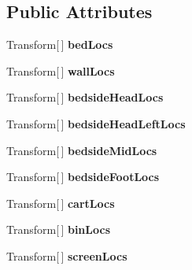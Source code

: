 \subsection*{Public Attributes}
\begin{DoxyCompactItemize}
\item 
Transform\mbox{[}$\,$\mbox{]} {\bfseries bed\+Locs}\hypertarget{class_room_script_a4e662f56439b7223b58794de1e0204a3}{}\label{class_room_script_a4e662f56439b7223b58794de1e0204a3}

\item 
Transform\mbox{[}$\,$\mbox{]} {\bfseries wall\+Locs}\hypertarget{class_room_script_a5fa75182517049f1d154ad7654a7d823}{}\label{class_room_script_a5fa75182517049f1d154ad7654a7d823}

\item 
Transform\mbox{[}$\,$\mbox{]} {\bfseries bedside\+Head\+Locs}\hypertarget{class_room_script_a4895a26a7d5bc3dcb280ca9d95f21643}{}\label{class_room_script_a4895a26a7d5bc3dcb280ca9d95f21643}

\item 
Transform\mbox{[}$\,$\mbox{]} {\bfseries bedside\+Head\+Left\+Locs}\hypertarget{class_room_script_ad00174270e0849852fb0f06169529bf5}{}\label{class_room_script_ad00174270e0849852fb0f06169529bf5}

\item 
Transform\mbox{[}$\,$\mbox{]} {\bfseries bedside\+Mid\+Locs}\hypertarget{class_room_script_a2383b4c41dfa2fc1a944c8a7396ea662}{}\label{class_room_script_a2383b4c41dfa2fc1a944c8a7396ea662}

\item 
Transform\mbox{[}$\,$\mbox{]} {\bfseries bedside\+Foot\+Locs}\hypertarget{class_room_script_a3942803d35d0c71a675cc1a7292ee75a}{}\label{class_room_script_a3942803d35d0c71a675cc1a7292ee75a}

\item 
Transform\mbox{[}$\,$\mbox{]} {\bfseries cart\+Locs}\hypertarget{class_room_script_ad57c202596ee13e7d4095f65f8e10041}{}\label{class_room_script_ad57c202596ee13e7d4095f65f8e10041}

\item 
Transform\mbox{[}$\,$\mbox{]} {\bfseries bin\+Locs}\hypertarget{class_room_script_a9fdc5d4be3f2e1edf67c322189c81524}{}\label{class_room_script_a9fdc5d4be3f2e1edf67c322189c81524}

\item 
Transform\mbox{[}$\,$\mbox{]} {\bfseries screen\+Locs}\hypertarget{class_room_script_a88100b483e74ac06eccbef01d4d7d7f1}{}\label{class_room_script_a88100b483e74ac06eccbef01d4d7d7f1}


\end{DoxyCompactItemize}
